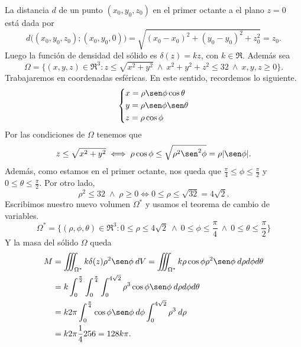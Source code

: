 \begin{solution}
  La distancia $d$ de un punto $(x_0,y_0,z_0)$ en el primer octante a el plano $z=0$ est\'a dada por $$d\Big(  (x_0,y_0,z_0); (x_0,y_0, 0) \Big)= \sqrt{(x_0-x_0)^2+(y_0-y_0)^2+z_0^2}=z_0.$$ Luego  la funci\'on de densidad del s\'olido es $\delta(z)=kz$,  con $k\in\Re$. Adem\'as  sea $$\Omega=\{(x,y,z)\in\Re^3:z\leq\sqrt{x^2+y^2}\:\land\:x^2+y^2+z^2\leq32\:\land\: x,y,z\geq0\}.$$
  Trabajaremos  en coordenadas esf\'ericas.  En este sentido,  recordemos lo siguiente.
  \[
    \begin{dcases}
      x=\rho\sen\phi\cos\theta \\
      y=\rho\sen\phi\sen\theta \\
      z=\rho\cos\phi
    \end{dcases}
  \]
  Por las condiciones de $\Omega$ tenemos que
  $$z\leq\sqrt{x^2+y^2}\iff\rho\cos\phi\leq\sqrt{\rho^2\sen^2\phi}=\rho |\sen\phi|.$$
  Adem\'as, como estamos en el primer octante,  nos queda que $\frac{\pi}{4} \leq\phi\leq\frac{\pi}{2}$ y  $0\leq\theta\leq\frac{\pi}{2}.$
  Por otro lado,  $$ \rho^2\leq32  \; \land \;  \rho \geq 0 \iff     0\leq  \rho\leq\sqrt{32}= 4 \sqrt{2}.$$
  Escribimos nuestro nuevo volumen $\Omega^*$  y usamos el teorema de cambio de variables.
  \[
    \Omega^*=\{(\rho,\phi,\theta)\in\Re^3:0\leq\rho\leq4\sqrt{2}\:\land\:0\leq\phi\leq\frac{\pi}{4}\:\land\:0\leq\theta\leq\frac{\pi}{2}\}
  \]
  Y la masa del s\'olido $\Omega$ queda
  \begin{align*}
    M & =\iiint_{\Omega^*}k\delta(z)\rho^2\sen\phi\:dV=\iiint_{\Omega^*}k\rho\cos\phi\rho^2\sen\phi\:d\rho d\phi d\theta \\
      & =k\int_0^{\frac{\pi}{2}} \int_0^{\frac{\pi}{4}} \int_0^{4\sqrt{2}}\rho^3\cos\phi\sen\phi \:d\rho d\phi d\theta   \\
      & =k2\pi\int_0^{\frac{\pi}{4}}\cos\phi\sen\phi\:d\phi\int_0^{4\sqrt{2}}\rho^3\:d\rho                               \\
      & =k2\pi\frac{1}{4}256=128k\pi.
  \end{align*}

\end{solution}